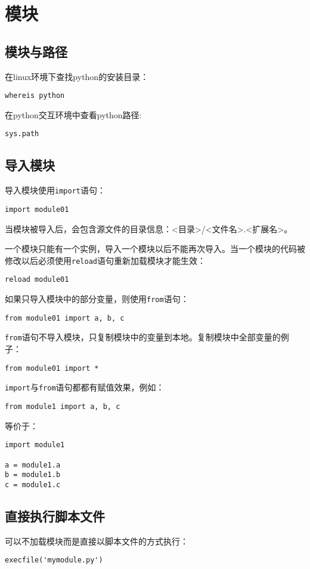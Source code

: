 
\chapter{模块}
	
	\section{模块与路径}
		
		在linux环境下查找python的安装目录：

\begin{lstlisting}
whereis python
\end{lstlisting}

		在python交互环境中查看python路径:

\begin{lstlisting}
sys.path
\end{lstlisting}

	\section{导入模块}

		导入模块使用\verb|import|语句：

\begin{lstlisting}
import module01
\end{lstlisting}

		当模块被导入后，会包含源文件的目录信息：<目录>/<文件名>.<扩展名>。

		一个模块只能有一个实例，导入一个模块以后不能再次导入。当一个模块的代码被修改以后必须使用\verb|reload|语句重新加载模块才能生效：

\begin{lstlisting}
reload module01
\end{lstlisting}

		如果只导入模块中的部分变量，则使用\verb|from|语句：
		
\begin{lstlisting}
from module01 import a, b, c
\end{lstlisting}

		\verb|from|语句不导入模块，只复制模块中的变量到本地。复制模块中全部变量的例子：

\begin{lstlisting}
from module01 import *
\end{lstlisting}

		\verb|import|与\verb|from|语句都都有赋值效果，例如：

\begin{lstlisting}
from module1 import a, b, c
\end{lstlisting}

		等价于：

\begin{lstlisting}
import module1

a = module1.a
b = module1.b
c = module1.c
\end{lstlisting}

%		


	\section{直接执行脚本文件}
		
		可以不加载模块而是直接以脚本文件的方式执行：

\begin{lstlisting}
execfile('mymodule.py')
\end{lstlisting}
